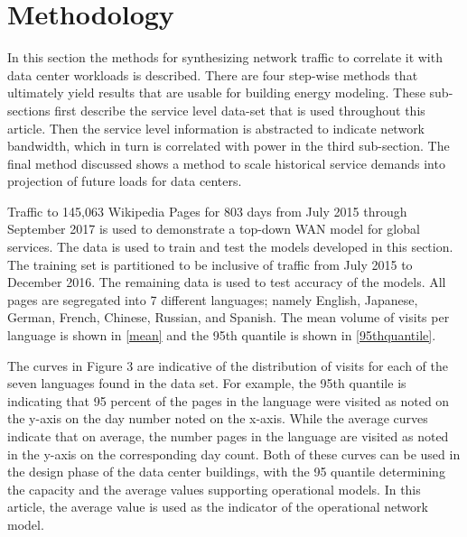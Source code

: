 \section{Methodology} 
    In this section the methods for synthesizing network traffic to correlate it with data center workloads is described. There are four step-wise methods that ultimately yield results that are usable for building energy modeling. These sub-sections first describe the service level data-set that is used throughout this article. Then the service level information is abstracted to indicate network bandwidth, which in turn is correlated with power in the third sub-section. The final method discussed shows a method to scale historical service demands into projection of future loads for data centers.  
    
    

    Traffic to 145,063 Wikipedia Pages for 803 days from July 2015 through September 2017 is used to demonstrate a top-down WAN model for global services. The data is used to train and test the models developed in this section. The training set is partitioned to be inclusive of traffic from July 2015 to December 2016. The remaining data is used to test accuracy of the models. All pages are segregated into 7 different languages; namely English, Japanese, German, French, Chinese, Russian, and Spanish. The mean volume of visits per language is shown in \ref{mean} and the 95th quantile is shown in \ref{95thquantile}.  
    
    The curves in Figure 3 are indicative of the distribution of visits for each of the seven languages found in the data set.  For example, the 95th quantile is indicating that 95 percent of the pages in the language were visited as noted on the y-axis on the day number noted on the x-axis. While the average curves indicate that on average, the number pages in the language are visited as noted in the y-axis on the corresponding day count. Both of these curves can be used in the design phase of the data center buildings, with the 95 quantile determining the capacity and the average values supporting operational models. In this article, the average value is used as the indicator of the operational network model. 
    
    